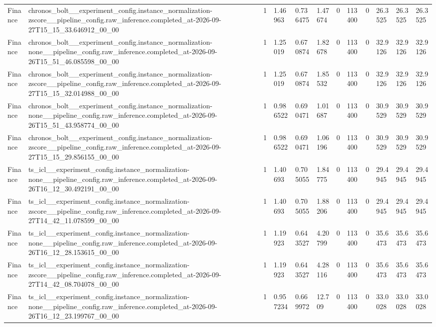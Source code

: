 \begin{tabular}{llllllllllll}
Finance & chronos\_bolt\_\_experiment\_config.instance\_normalization-zscore\_\_pipeline\_config.raw\_inference.completed\_at-2026-09-27T15\_15\_33.646912\_00\_00 & 1 & 1.46963 & 0.736475 & 1.47674 & 0 & 113400 & 0 & 26.3525 & 26.3525 & 26.3525 \\
Finance & chronos\_bolt\_\_experiment\_config.instance\_normalization-none\_\_pipeline\_config.raw\_inference.completed\_at-2026-09-26T15\_51\_46.085598\_00\_00 & 1 & 1.25019 & 0.670874 & 1.82678 & 0 & 113400 & 0 & 32.9126 & 32.9126 & 32.9126 \\
Finance & chronos\_bolt\_\_experiment\_config.instance\_normalization-zscore\_\_pipeline\_config.raw\_inference.completed\_at-2026-09-27T15\_15\_32.014988\_00\_00 & 1 & 1.25019 & 0.670874 & 1.85532 & 0 & 113400 & 0 & 32.9126 & 32.9126 & 32.9126 \\
Finance & chronos\_bolt\_\_experiment\_config.instance\_normalization-none\_\_pipeline\_config.raw\_inference.completed\_at-2026-09-26T15\_51\_43.958774\_00\_00 & 1 & 0.986522 & 0.690471 & 1.01687 & 0 & 113400 & 0 & 30.9529 & 30.9529 & 30.9529 \\
Finance & chronos\_bolt\_\_experiment\_config.instance\_normalization-zscore\_\_pipeline\_config.raw\_inference.completed\_at-2026-09-27T15\_15\_29.856155\_00\_00 & 1 & 0.986522 & 0.690471 & 1.06196 & 0 & 113400 & 0 & 30.9529 & 30.9529 & 30.9529 \\
Finance & ts\_icl\_\_experiment\_config.instance\_normalization-none\_\_pipeline\_config.raw\_inference.completed\_at-2026-09-26T16\_12\_30.492191\_00\_00 & 1 & 1.40693 & 0.705055 & 1.84775 & 0 & 113400 & 0 & 29.4945 & 29.4945 & 29.4945 \\
Finance & ts\_icl\_\_experiment\_config.instance\_normalization-zscore\_\_pipeline\_config.raw\_inference.completed\_at-2026-09-27T14\_42\_11.078599\_00\_00 & 1 & 1.40693 & 0.705055 & 1.88206 & 0 & 113400 & 0 & 29.4945 & 29.4945 & 29.4945 \\
Finance & ts\_icl\_\_experiment\_config.instance\_normalization-none\_\_pipeline\_config.raw\_inference.completed\_at-2026-09-26T16\_12\_28.153615\_00\_00 & 1 & 1.19923 & 0.643527 & 4.20799 & 0 & 113400 & 0 & 35.6473 & 35.6473 & 35.6473 \\
Finance & ts\_icl\_\_experiment\_config.instance\_normalization-zscore\_\_pipeline\_config.raw\_inference.completed\_at-2026-09-27T14\_42\_08.704078\_00\_00 & 1 & 1.19923 & 0.643527 & 4.28116 & 0 & 113400 & 0 & 35.6473 & 35.6473 & 35.6473 \\
Finance & ts\_icl\_\_experiment\_config.instance\_normalization-none\_\_pipeline\_config.raw\_inference.completed\_at-2026-09-26T16\_12\_23.199767\_00\_00 & 1 & 0.957234 & 0.669972 & 12.709 & 0 & 113400 & 0 & 33.0028 & 33.0028 & 33.0028 \\

\end{tabular}
